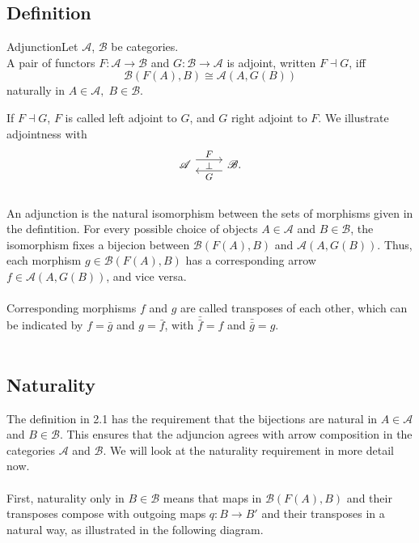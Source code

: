 \subsection*{Definition}
\begin{definition}{Adjunction}Let $\mathscr A$, $\mathscr B$ be categories. \\
	A pair of functors $F: \mathscr A \rightarrow \mathscr B$ and $G: \mathscr B \rightarrow \mathscr A$ is adjoint, written $F \dashv G$, iff
	\[\mathscr B(F(A), B) \cong \mathscr{A}(A, G(B))\]
 naturally in $A \in \mathscr A, \; B \in \mathscr B$.
\end{definition}
\vspace{\baselineskip}
 	If $F \dashv G$,  $F$ is called left adjoint to $G$, and $G$ right adjoint to $F$. We illustrate adjointness with 
 	\[
 	\begin{tikzcd}	
 		[ampersand replacement=\&, every label/.append style = {font = \footnotesize}]
 		\mathscr{A} \arrow[r, shift left=2,"F","\bot"']
 		\& \mathscr{B.} \arrow[l, shift left=2, "G"] 
 	\end{tikzcd}\]\\
 	An adjunction is the natural isomorphism between the sets of morphisms given in the defintition. For every possible choice of objects $A \in \mathscr A$ and $B \in \mathscr B$, the isomorphism fixes a bijecion between $\mathscr B(F(A), B)$ and $\mathscr A(A, G(B))$. Thus, each morphism $g \in \mathscr B(F(A), B)$ has a 
 	corresponding arrow $f \in \mathscr A(A, G(B))$, and vice versa. \\\\Corresponding morphisms $f$ and $g$ are called transposes of each other, which can be indicated by $f = \bar{g}$ and $g = \bar{f}$, with $\bar {\bar{f}} = f$ and $\bar {\bar{g}} = g.$
 	\\\\
\subsection*{Naturality}
	The definition in 2.1 has the requirement that the bijections are natural in $A \in \mathscr A$ and $B \in \mathscr B$. This ensures that the adjuncion agrees with arrow composition in the categories $\mathscr A$ and $\mathscr B$. We will look at the naturality requirement in more detail now.
	 \\\\
	First, naturality only in $B \in \mathscr B$ means that maps in $\mathscr B(F(A), B)$ and their transposes compose with outgoing maps $q : B \to B'$ and their transposes in a natural way, as illustrated in the following diagram.
	
